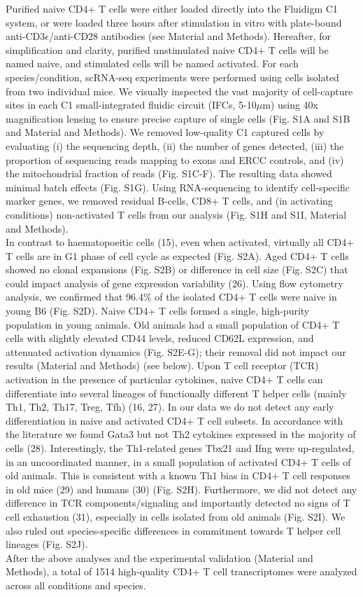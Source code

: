 Purified naive CD4+ T cells were either loaded directly into the Fluidigm C1 system, or were loaded three hours after stimulation in vitro with plate-bound anti-CD3$\epsilon$/anti-CD28 antibodies (see Material and Methods). Hereafter, for simplification and clarity, purified unstimulated naive CD4+ T cells will be named naive, and stimulated cells will be named activated. For each species/condition, scRNA-seq experiments were performed using cells isolated from two individual mice. We visually inspected the vast majority of cell-capture sites in each C1 small-integrated fluidic circuit (IFCs, 5-10$\mu$m) using 40x magnification lensing to ensure precise capture of single cells (Fig. S1A and S1B and Material and Methods). We removed low-quality C1 captured cells by evaluating (i) the sequencing depth, (ii) the number of genes detected, (iii) the proportion of sequencing reads mapping to exons and ERCC controls, and (iv) the mitochondrial fraction of reads (Fig. S1C-F). The resulting data showed minimal batch effects (Fig. S1G). Using RNA-sequencing to identify cell-specific marker genes, we removed residual B-cells, CD8+ T cells, and (in activating conditions) non-activated T cells from our analysis (Fig. S1H and S1I, Material and Methods). \\

In contrast to haematopoeitic cells (15), even when activated, virtually all CD4+ T cells are in G1 phase of cell cycle as expected (Fig. S2A). Aged CD4+ T cells showed no clonal expansions (Fig. S2B) or difference in cell size (Fig. S2C) that could impact analysis of gene expression variability (26). Using flow cytometry analysis, we confirmed that 96.4\% of the isolated CD4+ T cells were naive in young B6 (Fig. S2D). Naive CD4+ T cells formed a single, high-purity population in young animals. Old animals had a small population of CD4+ T cells with slightly elevated CD44 levels, reduced CD62L expression, and attenuated activation dynamics (Fig. S2E-G); their removal did not impact our results (Material and Methods) (see below). Upon T cell receptor (TCR) activation in the presence of particular cytokines, naive CD4+ T cells can differentiate into several lineages of functionally different T helper cells (mainly Th1, Th2, Th17, Treg, Tfh) (16, 27). In our data we do not detect any early differentiation in naive and activated CD4+ T cell subsets. In accordance with the literature we found Gata3 but not Th2 cytokines expressed in the majority of cells  (28). Interestingly, the Th1-related genes Tbx21 and Ifng were up-regulated, in an uncoordinated manner, in a small population of activated CD4+ T cells of old animals. This is consistent with a known Th1 bias in CD4+ T cell responses in old mice (29) and humans (30) (Fig. S2H). Furthermore, we did not detect any difference in TCR components/signaling and importantly detected no signs of T cell exhaustion (31), especially in cells isolated from old animals (Fig. S2I). We also ruled out species-specific differences in commitment towards T helper cell lineages (Fig. S2J). \\

After the above analyses and the experimental validation (Material and Methods), a total of 1514 high-quality CD4+ T cell transcriptomes were analyzed across all conditions and species.

